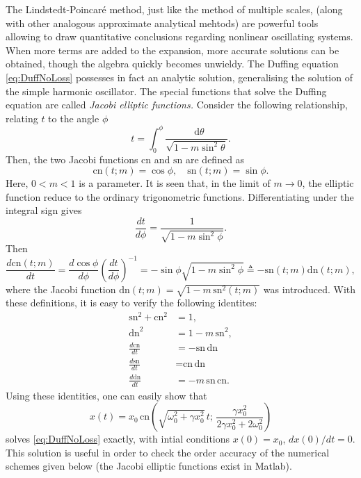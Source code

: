 \documentclass[11pt,twoside,a4paper,english]{book}
\newcommand{\dif}{\mathop{}\!\mathrm{d}}
\begin{document}
The Lindstedt-Poincar{\'e} method, just like the method of multiple scales, (along with other analogous approximate analytical mehtods) are powerful tools allowing to draw quantitative conclusions regarding nonlinear oscillating systems. When more terms are added to the expansion, more accurate solutions can be obtained, though the algebra quickly becomes unwieldy. The Duffing equation \eqref{eq:DuffNoLoss} possesses in fact an analytic solution, generalising the solution of the simple harmonic oscillator. The special functions that solve the Duffing equation are called \emph{Jacobi elliptic functions.} Consider the following relationship, relating $t$ to the angle $\phi$
\begin{equation}
t = \int_0^\phi \frac{\dif \theta}{\sqrt{1-m\sin^2\theta}}.
\end{equation}
Then, the two Jacobi functions $\text{cn}$ and $\text{sn}$ are defined as
\begin{equation}
\text{cn}(t;m) = \cos\phi, \quad \text{sn}(t;m) = \sin \phi.
\end{equation}
Here, $0<m<1$ is a parameter. It is seen that, in the limit of $m\rightarrow 0$, the elliptic function reduce to the ordinary trigonometric functions. Differentiating under the integral sign gives
\begin{equation}
\frac{dt}{d\phi} = \frac{1}{\sqrt{1-m\sin^2\phi}}. 
\end{equation}
Then
\begin{equation}
\frac{d\text{cn}(t;m)}{dt} = \frac{d\cos\phi}{d\phi}\left(\frac{dt}{d\phi}\right)^{-1} = -\sin\phi \sqrt{1-m\sin^2\phi} \triangleq - \text{sn}(t;m)\text{dn}(t;m),
\end{equation}
where the Jacobi function $\text{dn}(t;m) = \sqrt{1-m\,\text{sn}^2(t;m)}$ was introduced. With these definitions, it is easy to verify the following identites:
\begin{subequations}
\begin{align}
\text{sn}^2+\text{cn}^2 &= 1, \\
\text{dn}^2 &= 1 - m \, \text{sn}^2,\\
\frac{d\text{cn}}{dt}&= -\text{sn}\,\text{dn} \\
\frac{d\text{sn}}{dt} &= \text{cn}\,\text{dn} \\
\frac{d\text{dn}}{dt} &= - m\, \text{sn}\,\text{cn}.
\end{align}
\end{subequations}
Using these identities, one can easily show that
\begin{equation}
x(t) = x_0 \, \text{cn}\left( \sqrt{\omega_0^2 + \gamma x_0^2} \, t ; \, \frac{\gamma x_0^2}{2\gamma x_0^2 + 2\omega_0^2}\right)
\end{equation}
solves \eqref{eq:DuffNoLoss} exactly, with intial conditions $x(0) = x_0$, $dx(0)/dt = 0$. This solution is useful in order to check the order accuracy of the numerical schemes given below (the Jacobi elliptic functions exist in Matlab).
\end{document}
